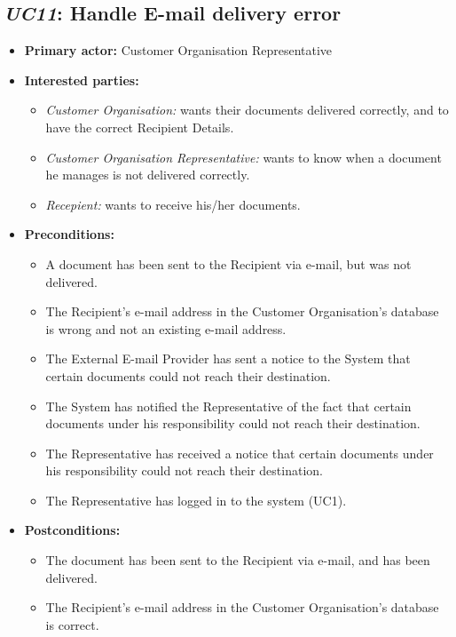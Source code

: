 \documentclass[a4paper,10pt]{article}
\begin{document}
\subsection{\emph{UC11}: Handle E-mail delivery error}
\begin{itemize}
    \item \textbf{Primary actor:} Customer Organisation Representative
    \item \textbf{Interested parties:} 
        \begin{itemize}
            \item \textit{Customer Organisation:} wants their documents delivered correctly, and to have the correct Recipient Details.
            \item \textit{Customer Organisation Representative:} wants to know when a document he manages is not delivered correctly.
            \item \textit{Recepient:} wants to receive his/her documents.
        \end{itemize}

    \item \textbf{Preconditions:}
        \begin{itemize}
            \item A document has been sent to the Recipient via e-mail, but was not delivered.
            \item The Recipient's e-mail address in the Customer Organisation's database is wrong and not an existing e-mail address.
            \item The External E-mail Provider has sent a notice to the System that certain documents could not reach their destination.
            \item The System has notified the Representative of the fact that certain documents under his responsibility could not reach their destination.
            \item The Representative has received a notice that certain documents under his responsibility could not reach their destination.
            \item The Representative has logged in to the system (UC1).
        \end{itemize}

    \item \textbf{Postconditions:}
        \begin{itemize}
            \item The document has been sent to the Recipient via e-mail, and has been delivered.
            \item The Recipient's e-mail address in the Customer Organisation's database is correct.
        \end{itemize}
        

\end{itemize}
\end{document}
